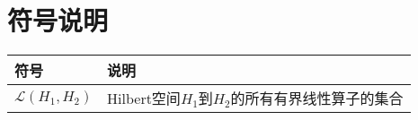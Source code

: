\chapter*{符号说明}

\begin{table}[h]
	\centering
	\begin{tabular}{ll}
		\toprule
		符号 & 说明 \\
        \midrule
	    $\mathcal{L}(H_1,H_2)$ & Hilbert空间$H_1$到$H_2$的所有有界线性算子的集合 \\
        \bottomrule
	\end{tabular}
\end{table}
